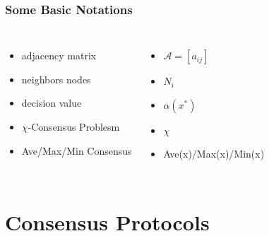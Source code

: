 \documentclass{beamer}
\begin{document}
\begin{frame}
    \frametitle{Some Basic Notations}
    
    \begin{columns}
    
    \begin{itemize}
    \item adjacency matrix
    \item neighbors nodes
    \item decision value
    \item $\chi$-Consensus Problesm
    \item Ave/Max/Min Consensus
    \end{itemize}
    
    \begin{itemize}
        \item $\mathcal{A}=[a_{ij}]$
        \item $N_i$
        \item $\alpha(x^*)$
        \item $\chi$
        \item Ave(x)/Max(x)/Min(x)
    \end{itemize}

    \end{columns}
    \end{frame}

\section{Consensus Protocols}
\end{document}
